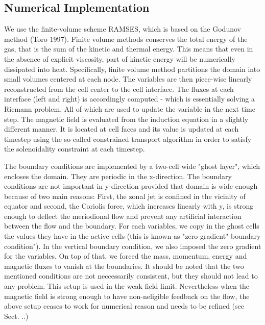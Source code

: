\documentclass[11pt]{article}
\begin{document}
\subsection{Numerical Implementation}

We use the finite-volume scheme RAMSES, which is based on the Godunov method (Toro 1997). Finite volume methods conserves the total energy of the gas, that is the sum of the kinetic and thermal energy. This means that even in the absence of explicit viscosity, part of kinetic energy will be numerically dissipated into heat.
Specifically, finite volume method partitions the domain into small volumes centered at each node. The variables are then piece-wise linearly reconstructed from the cell center to the cell interface. The fluxes at each interface (left and right) is accordingly computed - which is essentially solving a Riemann problem. All of which are used to update the variable in the next time step. The magnetic field is evaluated from the induction equation in a slightly different manner. It is located at cell faces and its value is updated at each timestep using the so-called constrained transport algorithm in order to satisfy the solenoidality constraint at each timestep.

The boundary conditions are implemented by a two-cell wide "ghost layer", which encloses the domain. They are periodic in the x-direction. The boundary conditions are not important in y-direction provided that domain is wide enough because of two main reasons: First, the zonal jet is confined in the vicinity of equator and second, the Coriolis force, which increases linearly with y, is strong enough to deflect the meriodional flow and prevent any artificial interaction between the flow and the boundary. For each variables, we copy in the ghost cells the values they have in the active cells (this is known as "zero-gradient" boundary condition"). In the vertical boundary condition, we also imposed the zero gradient for the variables. On top of that, we forced the mass, momentum, energy and magnetic fluxes to vanish at the boundaries. It should be noted that the two mentioned conditions are not neccessarily consistent, but they should not lead to any problem. This setup is used in the weak field limit. Nevertheless when the magnetic field is strong enough to have non-neligible feedback on the flow, the above setup ceases to work for numerical reason and needs to be refined (see Sect. ..)
\end{document}
